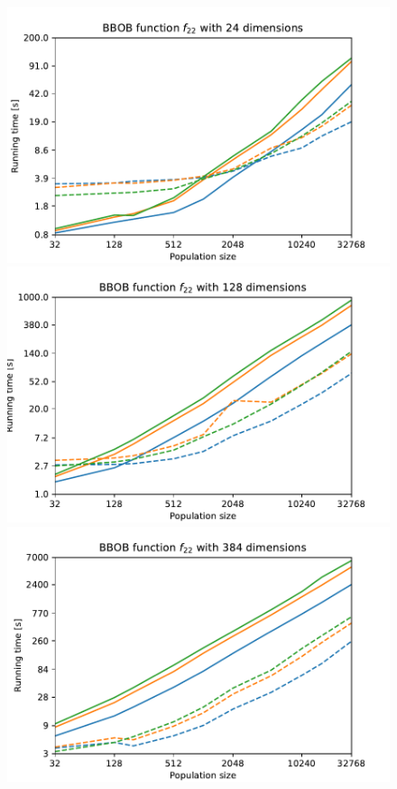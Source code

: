 \begin{figure}[ht!]
\begin{minipage}[t]{0.32\textwidth}
    \end{minipage}

    \begin{minipage}[t]{0.32\textwidth}
        \centering
        \includegraphics[width=\textwidth]{img/runs/time_es_schema_fn22_24d.pdf}
    \end{minipage}
    \hfill
    \begin{minipage}[t]{0.32\textwidth}
        \centering
        \includegraphics[width=\textwidth]{img/runs/time_es_schema_fn22_128d.pdf}
    \end{minipage}
    \hfill
    \begin{minipage}[t]{0.32\textwidth}
        \centering
        \includegraphics[width=\textwidth]{img/runs/time_es_schema_fn22_384d.pdf}

\end{minipage}
\end{figure}
